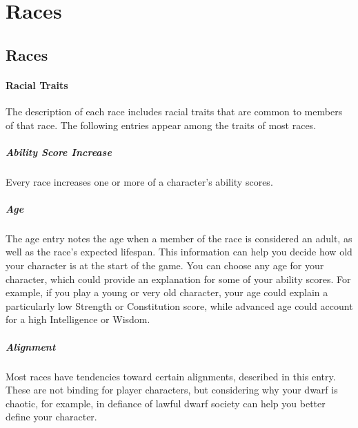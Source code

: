 \chapter{Races}
\hypertarget{races}{%
\section{Races}\label{races}}

\hypertarget{racial-traits}{%
\subsubsection{Racial Traits}\label{racial-traits}}

The description of each race includes racial traits that are common to
members of that race. The following entries appear among the traits of
most races.

\hypertarget{ability-score-increase}{%
\paragraph{Ability Score Increase}\label{ability-score-increase}}

Every race increases one or more of a character's ability scores.

\hypertarget{age}{%
\paragraph{Age}\label{age}}

The age entry notes the age when a member of the race is considered an
adult, as well as the race's expected lifespan. This information can
help you decide how old your character is at the start of the game. You
can choose any age for your character, which could provide an
explanation for some of your ability scores. For example, if you play a
young or very old character, your age could explain a particularly low
Strength or Constitution score, while advanced age could account for a
high Intelligence or Wisdom.

\hypertarget{alignment}{%
\paragraph{Alignment}\label{alignment}}

Most races have tendencies toward certain alignments, described in this
entry. These are not binding for player characters, but considering why
your dwarf is chaotic, for example, in defiance of lawful dwarf society
can help you better define your character.

